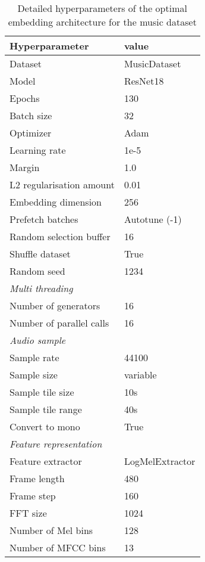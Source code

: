 \begin{table}[ht]
    \centering
    \caption{Detailed hyperparameters of the optimal embedding architecture for the music dataset}
	\label{tab:Hyperparameters-Detailed-Music}
    \begin{tabular}{l|l}
        \toprule
        \textbf{Hyperparameter} & \textbf{value} \\ 
        \midrule[1pt]
        Dataset & MusicDataset \\
        \hline
        Model & ResNet18 \\ 
        \hline
        Epochs & 130 \\ 
        \hline
        Batch size & 32 \\ 
        \hline
        Optimizer & Adam \\ 
        \hline
        Learning rate & 1e-5 \\
        \hline
        Margin & 1.0 \\
        \hline
        L2 regularisation amount & 0.01 \\
        \hline
        Embedding dimension & 256 \\
        \hline
        Prefetch batches & Autotune (-1) \\ 
        \hline
        Random selection buffer & 16 \\ 
        \hline
        Shuffle dataset & True \\
        \hline
        Random seed & 1234 \\
        \midrule[1pt]
        \multicolumn{2}{l}{\textit{Multi threading}} \\
        \midrule[1pt]
        Number of generators & 16 \\ 
        \hline
        Number of parallel calls & 16 \\
        \midrule[1pt]
        \multicolumn{2}{l}{\textit{Audio sample}} \\
        \midrule[1pt]
        Sample rate & 44100 \\ 
        \hline
        Sample size & variable \\
        \hline
        Sample tile size & 10s \\
        \hline
        Sample tile range & 40s \\
        \hline
        Convert to mono & True \\
        \midrule[1pt]
        \multicolumn{2}{l}{\textit{Feature representation}} \\
        \midrule[1pt]
        Feature extractor & LogMelExtractor \\ 
        \hline
        Frame length & 480 \\
        \hline
        Frame step & 160 \\
        \hline
        FFT size & 1024 \\
        \hline
        Number of Mel bins & 128 \\
        \hline
        Number of MFCC bins & 13 \\
        \bottomrule
    \end{tabular}
\end{table}

